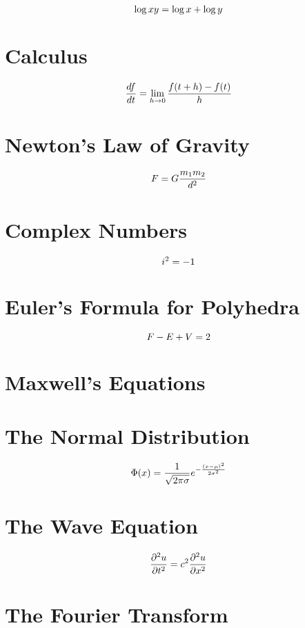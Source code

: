 \documentclass[]{article}
\begin{document}
{\fontsize{30pt}{36pt}\selectfont
	\[
	\LARGE{ \log x y = \log x + \log y
	}
	\]
	
\section{Calculus}

{\fontsize{30pt}{36pt}\selectfont
\[
\LARGE{
	\frac{df}{dt} = \lim_{h \rightarrow 0} \frac{f(t+h) - f(t)}{h}
}
\]
	
\section{Newton's Law of Gravity}

{\fontsize{30pt}{36pt}\selectfont
	\[
	\LARGE{
		F = G \frac{m_1 m_2}{d^2}
	}
	\]
	
}\section{Complex Numbers}

{\fontsize{30pt}{36pt}\selectfont
\[
\LARGE{
	i^2 = -1
}
\]
}

\section{Euler's Formula for Polyhedra}

{\fontsize{30pt}{36pt}\selectfont
	\[
	\LARGE{
		F - E + V = 2
	}
	\]
}

\section{Maxwell's Equations}

\section{The Normal Distribution}

{\fontsize{30pt}{36pt}\selectfont
	\[
	\LARGE{
		\Phi(x) =  \frac{1}{\sqrt{2 \pi \sigma}} e^{- \frac{(x - \mu)^2}{2 \sigma^2}}
		}
	\]
}

\section{The Wave Equation}

{\fontsize{30pt}{36pt}\selectfont
\[
\LARGE{\frac{\partial{{^2}u}}{{\partial{t}^2}} = c^2 \frac{\partial{{^2}u}}{{\partial{x}^2}}}
\]
}

\section{The Fourier Transform}

}}
\end{document}
